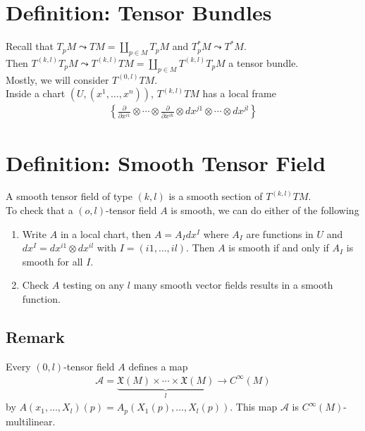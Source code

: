 \documentclass[11pt]{article}
\begin{document}
\section*{Definition: Tensor Bundles}
\label{sec:org7a5370a}
Recall that \(T_{p}M\leadsto TM=\coprod_{p\in M}T_{p}M\) and \(T^{*}_{p}M\leadsto T^{*}M\).\\
Then \(T^{(k,l)}T_{p}M\leadsto T^{(k,l)}TM=\coprod_{p\in M}T^{(k,l)}T_{p}M\) a tensor bundle.\\
Mostly, we will consider \(T^{(0,l)}TM\).\\
Inside a chart \((U,(x^{1},\ldots,x^{n}))\), \(T^{(k,l)}TM\) has a local frame\\
\begin{align*}
  \left\{ \frac{\partial}{\partial x^{i1}}\otimes\cdots\otimes\frac{\partial}{\partial x^{ik}}\otimes dx^{j1}\otimes\cdots\otimes dx^{jl} \right\}
\end{align*}
\section*{Definition: Smooth Tensor Field}
\label{sec:orgc14ca68}
A smooth tensor field of type \((k,l)\) is a smooth section of \(T^{(k,l)}TM\).\\
To check that a \((o,l)\)-tensor field \(A\) is smooth, we can do either of the following\\
\begin{enumerate}
\item Write \(A\) in a local chart, then \(A=A_{I}dx^{I}\) where \(A_{I}\) are functions in \(U\) and \(dx^{I}=dx^{i1}\otimes dx^{il}\) with \(I=(i1,\ldots,il)\). Then \(A\) is smooth if and only if \(A_{I}\) is smooth for all \(I\).\\
\item Check \(A\) testing on any \(l\) many smooth vector fields results in a smooth function.\\
\end{enumerate}
\subsection*{Remark}
\label{sec:org5fead25}
Every \((0,l)\)-tensor field \(A\) defines a map\\
\begin{align*}
  \mathcal{A}=\underbrace{\mathfrak{X}(M)\times\cdots\times\mathfrak{X}(M)}_{l}\to C^{\infty}(M)
\end{align*}
by \(A(x_{1},\ldots,X_{l})(p)=A_{p}(X_{1}(p),\ldots,X_{l}(p))\). This map \(\mathcal{A}\) is \(C^{\infty}(M)\)-multilinear.\\
\end{document}
